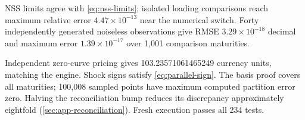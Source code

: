 NSS limits agree with \cref{eq:nss-limits}; isolated loading comparisons reach maximum relative error \(4.47\times10^{-13}\) near the numerical switch. Forty independently generated noiseless observations give RMSE \(3.29\times10^{-18}\) decimal and maximum error \(1.39\times10^{-17}\) over 1,001 comparison maturities.

Independent zero-curve pricing gives 103.23571061465249 currency units, matching the engine. Shock signs satisfy \cref{eq:parallel-sign}. The basis proof covers all maturities; 100,008 sampled points have maximum computed partition error zero. Halving the reconciliation bump reduces its discrepancy approximately eightfold (\cref{sec:app-reconciliation}). Fresh execution passes all 234 tests.
\clearpage
